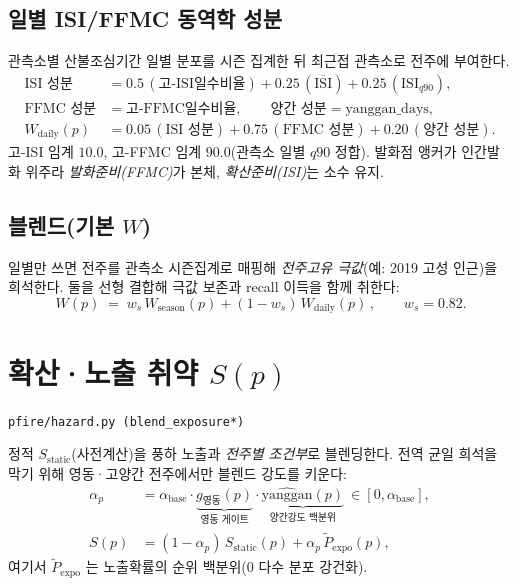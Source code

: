 \documentclass[11pt,a4paper]{article}
\newcommand{\src}[1]{{\footnotesize\color{gray}\texttt{#1}}}
\begin{document}
\subsection{일별 ISI/FFMC 동역학 성분}
관측소별 산불조심기간 일별 분포를 시즌 집계한 뒤 최근접 관측소로 전주에 부여한다.
\begin{align}
\text{ISI 성분} &= 0.5\,(\text{고-ISI일수비율}) + 0.25\,(\overline{\text{ISI}})
+ 0.25\,(\text{ISI}_{q90}),\\
\text{FFMC 성분} &= \text{고-FFMC일수비율},\qquad
\text{양간 성분}=\mathrm{yanggan\_days},\\
W_{\text{daily}}(p) &= 0.05\,(\text{ISI 성분}) + 0.75\,(\text{FFMC 성분})
+ 0.20\,(\text{양간 성분}).
\end{align}
고-ISI 임계 $10.0$, 고-FFMC 임계 $90.0$(관측소 일별 $q90$ 정합). 발화점 앵커가
인간발화 위주라 \emph{발화준비(FFMC)}가 본체, \emph{확산준비(ISI)}는 소수 유지.

\subsection{블렌드(기본 $W$)}
일별만 쓰면 전주를 관측소 시즌집계로 매핑해 \emph{전주고유 극값}(예: 2019 고성 인근)을
희석한다. 둘을 선형 결합해 극값 보존과 recall 이득을 함께 취한다:
\begin{equation}
\boxed{\,W(p)\;=\;w_s\,W_{\text{season}}(p)+(1-w_s)\,W_{\text{daily}}(p)\,},
\qquad w_s=0.82.
\end{equation}

\section{확산·노출 취약 $S(p)$}
\src{pfire/hazard.py (blend\_exposure*)}

정적 $S_{\text{static}}$(사전계산)을 풍하 노출과 \emph{전주별 조건부}로 블렌딩한다.
전역 균일 희석을 막기 위해 영동·고양간 전주에서만 블렌드 강도를 키운다:
\begin{align}
\alpha_p &= \alpha_{\text{base}}\cdot \underbrace{g_{\text{영동}}(p)}_{\text{영동 게이트}}
\cdot \underbrace{\widehat{\mathrm{yanggan}}(p)}_{\text{양간강도 백분위}}\ \in[0,\alpha_{\text{base}}],\\
S(p) &= (1-\alpha_p)\,S_{\text{static}}(p) + \alpha_p\,\widetilde{P}_{\text{expo}}(p),
\end{align}
여기서 $\widetilde{P}_{\text{expo}}$ 는 노출확률의 순위 백분위(0 다수 분포 강건화).
\end{document}
